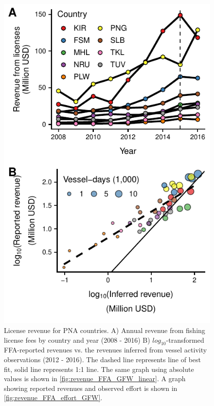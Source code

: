 \documentclass[12pt]{article}
\begin{document}
\begin{figure}[htbp]
\centering
\includegraphics{img/revenues.pdf}
\caption{\label{fig:revenues}
License revenue for PNA countries. A) Annual revenue from fishing license fees by country and year (2008 - 2016) B) $log_{10}$-transformed FFA-reported revenues vs. the revenues inferred from vessel activity observations (2012 - 2016). The dashed line represents line of best fit, solid line represents 1:1 line. The same graph using absolute values is shown in \ref{fig:revenue_FFA_GFW_linear}. A graph showing reported revenues and observed effort is shown in \ref{fig:revenue_FFA_effort_GFW}.}
\end{figure}
\end{document}
